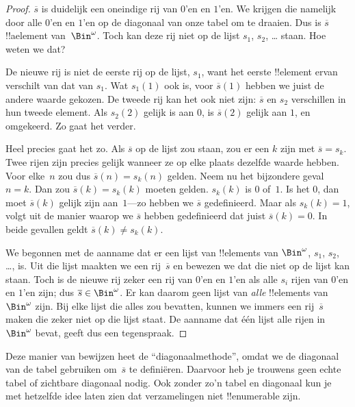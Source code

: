 \documentclass[openany]{memoir}
\begin{document}
\begin{proof}
$\overline{s}$ is duidelijk een oneindige rij van $0$'en en $1$'en.
We krijgen die namelijk door alle $0$'en en $1$'en op de diagonaal van
onze tabel om te draaien. Dus is $\overline{s}$ !!a{element}
van~$\Bin^\omega$. Toch kan deze rij niet op de lijst $s_1$, $s_2$,
\dots{} staan. Hoe weten we dat?

De nieuwe rij is niet de eerste rij op de lijst, $s_1$, want het eerste
!!{element} ervan verschilt van dat van $s_1$. Wat $s_1(1)$ ook is,
voor $\overline{s}(1)$ hebben we juist de andere waarde gekozen. De
tweede rij kan het ook niet zijn: $\overline{s}$ en $s_2$ verschillen
in hun tweede element. Als $s_2(2)$ gelijk is aan $0$, is
$\overline{s}(2)$ gelijk aan $1$, en omgekeerd. Zo gaat het verder.

Heel precies gaat het zo. Als $\overline{s}$ op de lijst zou staan, zou
er een $k$ zijn met $\overline{s} = s_{k}$. Twee rijen zijn precies gelijk
wanneer ze op elke plaats dezelfde waarde hebben.
Voor elke~$n$ zou dus $\overline{s}(n) = s_{k}(n)$ gelden. Neem nu het
bijzondere geval $n = k$. Dan zou $\overline{s}(k) = s_{k}(k)$ moeten
gelden. $s_k(k)$ is $0$ of~$1$. Is het $0$, dan moet
$\overline{s}(k)$ gelijk zijn aan~$1$---zo hebben we $\overline{s}$
gedefinieerd. Maar als $s_k(k) = 1$, volgt uit de manier waarop we
$\overline{s}$ hebben gedefinieerd dat juist $\overline{s}(k) = 0$.
In beide gevallen geldt
$\overline{s}(k) \neq s_{k}(k)$.

We begonnen met de aanname dat er een lijst van !!{element}s van
$\Bin^\omega$, $s_1$, $s_2$, \dots{}, is. Uit die lijst maakten we een
rij~$\overline{s}$ en bewezen we dat die niet op de lijst kan staan.
Toch is de nieuwe rij zeker een rij van $0$'en en $1$'en als alle
$s_i$ rijen van $0$'en en $1$'en zijn; dus $\overline{s} \in
\Bin^\omega$. Er kan daarom geen lijst van \emph{alle} !!{element}s
van~$\Bin^\omega$ zijn. Bij elke lijst die alles zou bevatten, kunnen
we immers een rij~$\overline{s}$ maken die zeker niet op die lijst
staat. De aanname dat één lijst alle rijen in~$\Bin^\omega$ bevat,
geeft dus een tegenspraak.
\end{proof}

\begin{explain}
Deze manier van bewijzen heet de ``diagonaalmethode'', omdat we de
diagonaal van de tabel gebruiken om~$\overline{s}$ te definiëren.
Daarvoor heb je trouwens geen echte tabel of zichtbare diagonaal nodig.
Ook zonder zo'n tabel en diagonaal kun je met hetzelfde idee laten zien
dat verzamelingen niet !!{enumerable} zijn.
\end{explain}
\end{document}
